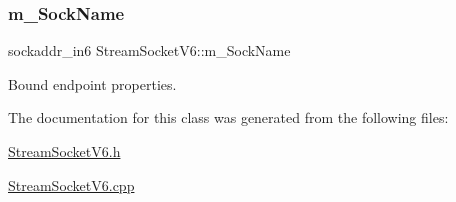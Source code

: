 \subsubsection{\texorpdfstring{m\+\_\+\+Sock\+Name}{m\_SockName}}
{\footnotesize\ttfamily sockaddr\+\_\+in6 Stream\+Socket\+V6\+::m\+\_\+\+Sock\+Name\hspace{0.3cm}{\ttfamily [protected]}}



Bound endpoint properties. 



The documentation for this class was generated from the following files\+:\begin{DoxyCompactItemize}
\item 
\hyperlink{StreamSocketV6_8h}{Stream\+Socket\+V6.\+h}\item 
\hyperlink{StreamSocketV6_8cpp}{Stream\+Socket\+V6.\+cpp}\end{DoxyCompactItemize}

